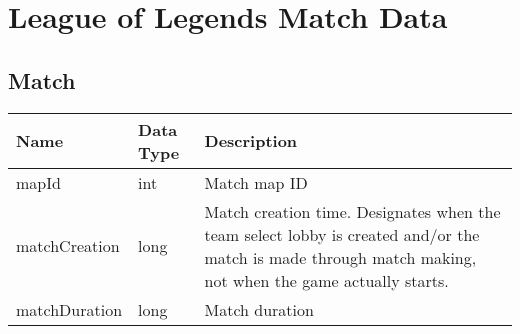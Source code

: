 \section{League of Legends Match Data}\label{sec:matchdata}

\subsection{Match}
\begin{longtable}{|llp{5cm}|}
\hline
\textbf{Name}         & \textbf{Data Type}& \textbf{Description} \\ 
\hline
  mapId                 & int              & Match map ID                                                                                                                                                                                                                                                                                                                                                                                                                                                                                                                                                                                                                            \\ \hline
matchCreation         & long                          & Match creation time. Designates when the team select lobby is created and/or the match is made through match making, not when the game actually starts.                                                                                                                                                                                                                                                                                                                                                                                                                                                                                 \\ \hline
matchDuration         & long                          & Match duration                                                                                                                                                                                                                                                                                                                                                                                                                                                                                                                                                                                                                          \\ \hline

\end{longtable}

